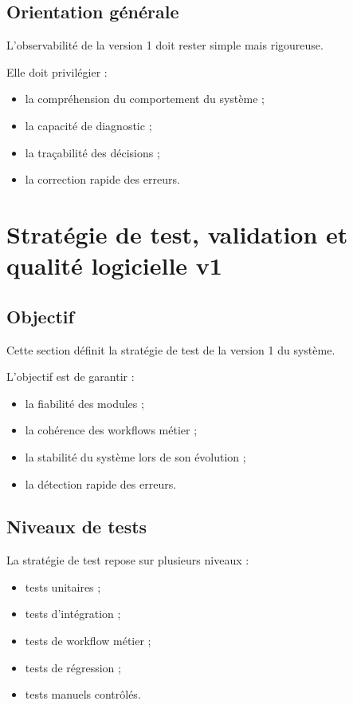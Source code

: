 \documentclass[11pt,a4paper]{article}
\begin{document}
\subsection{Orientation générale}

L’observabilité de la version 1 doit rester simple mais rigoureuse.

Elle doit privilégier :

\begin{itemize}
    \item la compréhension du comportement du système ;
    \item la capacité de diagnostic ;
    \item la traçabilité des décisions ;
    \item la correction rapide des erreurs.
\end{itemize}
\section{Stratégie de test, validation et qualité logicielle v1}

\subsection{Objectif}

Cette section définit la stratégie de test de la version 1 du système.

L’objectif est de garantir :

\begin{itemize}
    \item la fiabilité des modules ;
    \item la cohérence des workflows métier ;
    \item la stabilité du système lors de son évolution ;
    \item la détection rapide des erreurs.
\end{itemize}

\subsection{Niveaux de tests}

La stratégie de test repose sur plusieurs niveaux :

\begin{itemize}
    \item tests unitaires ;
    \item tests d’intégration ;
    \item tests de workflow métier ;
    \item tests de régression ;
    \item tests manuels contrôlés.
\end{itemize}
\end{document}
